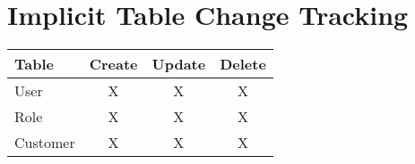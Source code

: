 \part{Implicit Table Change Tracking}
\begin{small}
\begin{tabular}{ p{5cm} c c c }
\textbf{Table} & \textbf{Create} & \textbf{Update} & \textbf{Delete} \\ \hline 
User & X & X & X \\ 
Role & X & X & X \\ 
Customer & X & X & X \\ 
\end{tabular}
\end{small}
